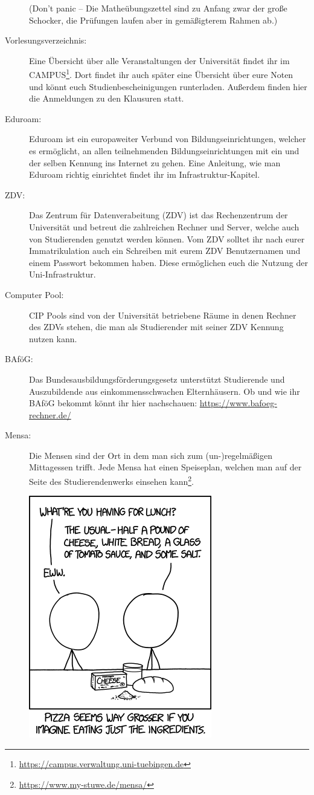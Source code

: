 \begin{description}
(Don't panic -- Die Matheübungszettel sind zu Anfang zwar der gro\ss e
  Schocker, die Prüfungen laufen aber in gemä\ss igterem Rahmen ab.)

\item [Vorlesungsverzeichnis:] Eine Übersicht über alle Veranstaltungen der Universität findet ihr im CAMPUS\footnote{\url{https://campus.verwaltung.uni-tuebingen.de}}. Dort findet ihr auch später eine Übersicht über eure Noten und könnt euch Studienbescheinigungen runterladen.
Außerdem finden hier die Anmeldungen zu den Klausuren statt.
 
\item [Eduroam:] Eduroam ist ein europaweiter Verbund von Bildungseinrichtungen, welcher es ermöglicht, an allen teilnehmenden Bildungseinrichtungen mit ein und der selben Kennung ins Internet zu gehen.
Eine Anleitung, wie man Eduroam richtig einrichtet findet ihr im Infrastruktur-Kapitel.

\item [ZDV:] Das Zentrum für Datenverabeitung (ZDV) ist das Rechenzentrum der Universität und betreut die zahlreichen Rechner und Server, welche auch von Studierenden genutzt werden können. Vom ZDV solltet ihr nach eurer Immatrikulation auch ein Schreiben mit eurem ZDV Benutzernamen und einem Passwort bekommen haben. Diese ermöglichen euch die Nutzung der Uni-Infrastruktur.

\item [Computer Pool:] CIP Pools sind von der Universität betriebene Räume in denen Rechner des ZDVs stehen, die man als Studierender mit seiner ZDV Kennung nutzen kann.

\item[BAföG:] Das Bundesausbildungsförderungsgesetz unterstützt Studierende und Auszubildende aus einkommensschwachen Elternhäusern. Ob und wie ihr BAföG bekommt könnt ihr hier nachschauen: \url{https://www.bafoeg-rechner.de/}

\item[Mensa:] Die Mensen sind der Ort in dem man sich zum (un-)regelmäßigen Mittagessen trifft. Jede Mensa hat einen Speiseplan, welchen man auf der Seite des Studierendenwerks einsehen kann\footnote{\url{https://www.my-stuwe.de/mensa/}}.

\vfill

\begin{center}
\includegraphics[width=0.4\hsize]{info/xkcd/lunch.png}
\end{center}

\pagebreak

\end{description}

